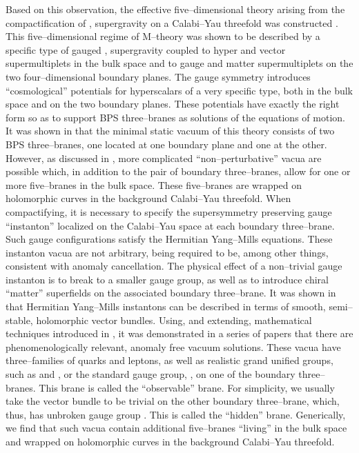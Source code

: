 \documentclass[a4paper,12pt]{article}
\numberwithin{equation}{section}
\theoremstyle{plain}
\begin{document}
Based on this observation, the effective five--dimensional theory arising from
the compactification of \coordHE{}, \coordHE{} supergravity on a Calabi--Yau threefold
was constructed \cite{losw1, losw2}. 
This five--dimensional regime of M--theory was shown to be
described by a specific type of gauged \coordHE{}, \coordHE{} supergravity
coupled to hyper and vector supermultiplets in the bulk space and
to gauge and matter supermultiplets on the two four--dimensional boundary planes. 
The gauge symmetry introduces ``cosmological'' potentials for 
hyperscalars of a very specific type, both in
the bulk space and on the two boundary planes. These potentials have exactly
the right form so as to support BPS three--branes as solutions of the
equations of motion. It was shown in \cite{losw1} that the minimal 
static vacuum of this
theory consists of two BPS three--branes, one located 
at one boundary plane
and one at the other. However, as discussed in \cite{nse}, 
more complicated
``non--perturbative'' vacua are possible which, in addition to the 
pair of
boundary three--branes, allow for one or more five--branes in the bulk space.
These five--branes are wrapped on holomorphic curves in the background
Calabi--Yau threefold. When compactifying, it is necessary to 
specify the \coordHE{} supersymmetry preserving \coordHE{} 
gauge ``instanton'' localized on the Calabi--Yau 
space at each boundary three--brane. Such gauge configurations satisfy the
Hermitian Yang--Mills equations. These instanton vacua are not
arbitrary, being required to be, among other things, consistent with
anomaly cancellation. The physical effect of a non--trivial gauge instanton is 
to break \coordHE{} to a smaller gauge group, as well as to introduce 
chiral ``matter'' superfields on the associated boundary three--brane. 
It was shown in \cite{Don, UhYau} that Hermitian Yang--Mills instantons can be described in
terms of smooth, semi--stable, holomorphic vector bundles. Using, and extending, 
mathematical techniques introduced in \cite{FMW, FMW2, D, BJPS}, 
it was demonstrated 
in a series of papers \cite{don1, don2, don3} that 
there are phenomenologically relevant, 
anomaly free vacuum solutions. These vacua have 
three--families of quarks and leptons, as well as realistic 
grand unified groups, such as \coordHE{} and \coordHE{}, 
or the standard gauge group, \coordHE{}, 
on one of the boundary
three--branes. This brane is  called the ``observable'' brane. 
For simplicity,
we usually take the vector bundle to be trivial on the other boundary
three--brane, which, thus, has unbroken gauge group \coordHE{}. This is called the
``hidden'' brane. Generically, we find that such vacua contain additional 
five--branes  ``living'' in the bulk space and wrapped on holomorphic curves
in the background Calabi--Yau threefold.
\end{document}
